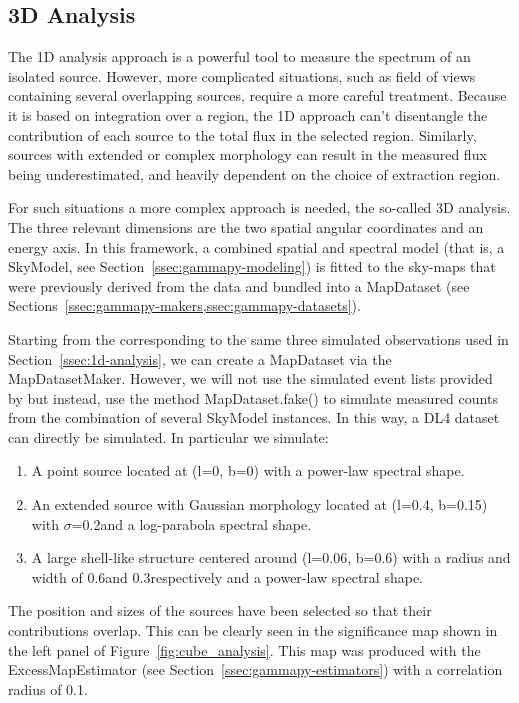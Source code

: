 \subsection{3D Analysis}
\label{ssec:3d-analysis}
The 1D analysis approach is a powerful tool to measure the spectrum of an isolated source. However, more complicated situations, such as field of views containing several overlapping sources, require a more careful treatment. Because it is based on integration over a region, the 1D approach can't disentangle the contribution of each source to the total flux in the selected region. Similarly, sources with extended or complex morphology can result in the measured flux being underestimated, and heavily dependent on the choice of extraction region.

\cite{Mohrmann2019}

For such situations a more complex approach is needed, the so-called 3D analysis. The three relevant dimensions are the two spatial angular coordinates and an energy axis. In this framework, a combined spatial and spectral model (that is, a SkyModel, see Section~\ref{ssec:gammapy-modeling}) is fitted to the sky-maps that were previously derived from the data and bundled into a MapDataset (see Sections~\ref{ssec:gammapy-makers,ssec:gammapy-datasets}).

Starting from the \irfs corresponding to the same three simulated \cta observations used in Section~\ref{ssec:1d-analysis}, we can create a MapDataset via the MapDatasetMaker. However, we will not use the simulated event lists provided by \cta but instead, use the method MapDataset.fake() to simulate measured counts from the combination of several SkyModel instances. In this way, a DL4 dataset can directly be simulated. In particular we simulate:
\begin{enumerate}
	\item A point source located at (l=0\textdegree, b=0\textdegree) with a power-law spectral shape.
	\item An extended source with Gaussian morphology located at (l=0.4\textdegree, b=0.15\textdegree) with $\sigma$=0.2\textdegree and a log-parabola spectral shape.
	\item A large shell-like structure centered around (l=0.06\textdegree, b=0.6\textdegree) with a radius and width of 0.6\textdegree and 0.3\textdegree respectively and a power-law spectral shape.
\end{enumerate}
The position and sizes of the sources have been selected so that their contributions overlap. This can be clearly seen in the significance map shown in the left panel of Figure~\ref{fig:cube_analysis}. This map was produced with the ExcessMapEstimator (see Section~\ref{ssec:gammapy-estimators}) with a correlation radius of 0.1\textdegree.

